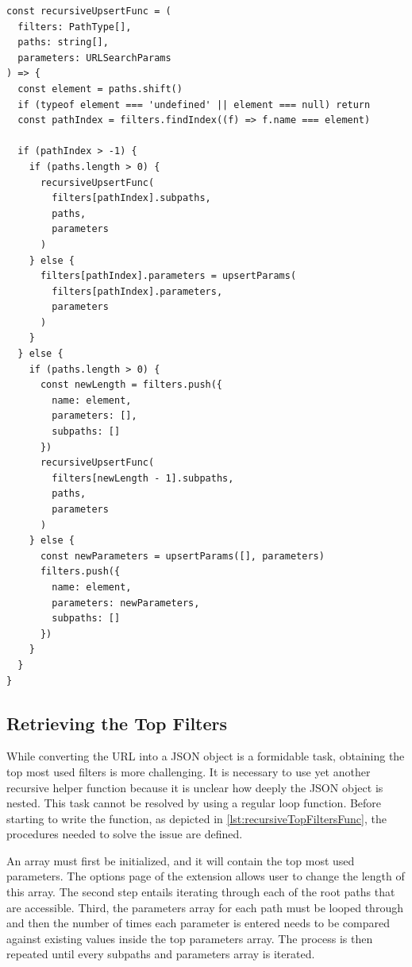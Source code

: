 \begin{lstlisting}[style=ES6, caption={Resursive pathname to JSON function (TypeScript)}, label={lst:recursiveUpsertFunc}]
const recursiveUpsertFunc = (
  filters: PathType[],
  paths: string[],
  parameters: URLSearchParams
) => {
  const element = paths.shift()
  if (typeof element === 'undefined' || element === null) return
  const pathIndex = filters.findIndex((f) => f.name === element)

  if (pathIndex > -1) {
    if (paths.length > 0) {
      recursiveUpsertFunc(
        filters[pathIndex].subpaths,
        paths,
        parameters
      )
    } else {
      filters[pathIndex].parameters = upsertParams(
        filters[pathIndex].parameters,
        parameters
      )
    }
  } else {
    if (paths.length > 0) {
      const newLength = filters.push({
        name: element,
        parameters: [],
        subpaths: []
      })
      recursiveUpsertFunc(
        filters[newLength - 1].subpaths,
        paths,
        parameters
      )
    } else {
      const newParameters = upsertParams([], parameters)
      filters.push({
        name: element,
        parameters: newParameters,
        subpaths: []
      })
    }
  }
}
\end{lstlisting}

\subsection*{Retrieving the Top Filters}
While converting the URL into a JSON object is a formidable task, obtaining the top most used filters is more challenging. It is necessary to use yet another recursive helper function because it is unclear how deeply the JSON object is nested. This task cannot be resolved by using a regular loop function. Before starting to write the function, as depicted in \autoref{lst:recursiveTopFiltersFunc}, the procedures needed to solve the issue are defined.

An array must first be initialized, and it will contain the top most used parameters. The options page of the extension allows user to change the length of this array. The second step entails iterating through each of the root paths that are accessible. Third, the parameters array for each path must be looped through and then the number of times each parameter is entered needs to be compared against existing values inside the top parameters array. The process is then repeated until every subpaths and parameters array is iterated.

